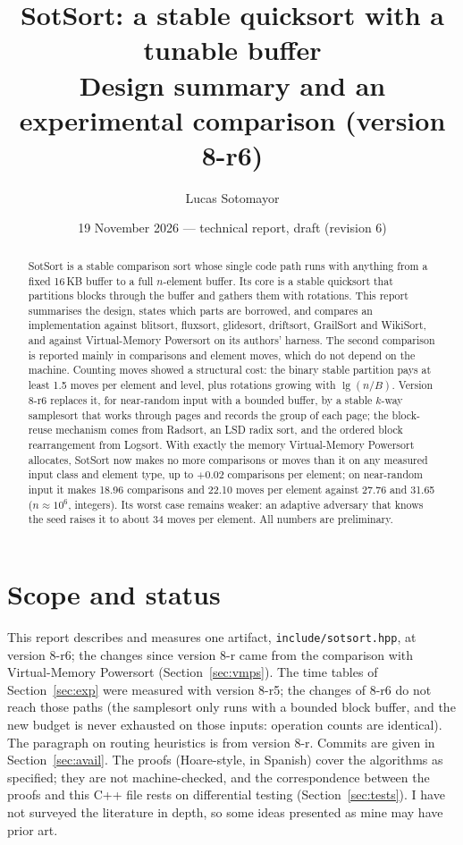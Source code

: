 \documentclass[10pt,a4paper]{article}
\title{\textbf{SotSort}: a stable quicksort with a tunable buffer\\[3pt]
\large Design summary and an experimental comparison (version 8-r6)}
\author{Lucas Sotomayor}
\date{19 November 2026 --- technical report, draft (revision 6)}
\begin{document}
\maketitle

\begin{abstract}
SotSort is a stable comparison sort whose single code path runs with anything from a fixed
16\,KB buffer to a full $n$-element buffer. Its core is a stable quicksort that partitions blocks
through the buffer and gathers them with rotations. This report summarises the design, states
which parts are borrowed, and compares an implementation against blitsort, fluxsort, glidesort,
driftsort, GrailSort and WikiSort, and against Virtual-Memory Powersort on its authors' harness.
The second comparison is reported mainly in comparisons and element moves, which do not depend on
the machine. Counting moves showed a structural cost: the binary stable partition pays at least
1.5 moves per element and level, plus rotations growing with $\lg(n/B)$. Version 8-r6 replaces
it, for near-random input with a bounded buffer, by a stable $k$-way samplesort that works
through pages and records the group of each page; the block-reuse mechanism comes from
Radsort, an LSD radix sort, and the ordered block rearrangement from Logsort. With exactly the
memory Virtual-Memory Powersort allocates, SotSort now makes no more comparisons or moves than
it on any measured input class and element type, up to $+0.02$ comparisons per element;
on near-random input it makes 18.96 comparisons and 22.10 moves per element against 27.76 and
31.65 ($n\approx10^6$, integers). Its worst case remains weaker: an adaptive adversary that
knows the seed raises it to about 34 moves per element. All numbers are preliminary.
\end{abstract}

\section{Scope and status}
This report describes and measures one artifact, \texttt{include/sotsort.hpp}, at version
8-r6; the changes since version 8-r came from the comparison with Virtual-Memory Powersort
(Section~\ref{sec:vmps}). The time tables of Section~\ref{sec:exp} were measured with version
8-r5; the changes of 8-r6 do not reach those paths (the samplesort only runs with a bounded
block buffer, and the new budget is never exhausted on those inputs: operation counts are
identical). The paragraph on routing heuristics is from version 8-r. Commits are given in
Section~\ref{sec:avail}. The proofs (Hoare-style, in Spanish) cover
the algorithms as specified; they are not machine-checked, and the correspondence between the
proofs and this C++ file rests on differential testing (Section~\ref{sec:tests}). I have not
surveyed the literature in depth, so some ideas presented as mine may have prior art.
\end{document}
